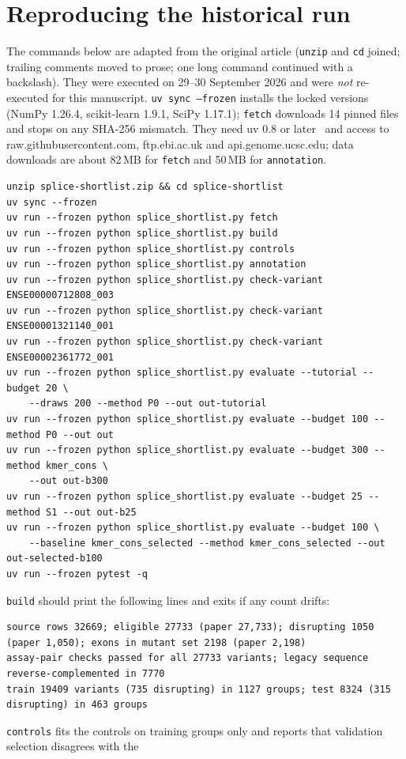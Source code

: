 \documentclass[11pt]{article}
\begin{document}
\section{Reproducing the historical run}\label{app:repro}
The commands below are adapted from the original article (\texttt{unzip} and \texttt{cd} joined; trailing comments moved
to prose; one long command continued with a backslash). They were executed on 29--30 September 2026 and were
\emph{not} re-executed for this manuscript. \texttt{uv sync --frozen} installs the locked versions (NumPy 1.26.4,
scikit-learn 1.9.1, SciPy 1.17.1); \texttt{fetch} downloads 14 pinned files and stops on any SHA-256 mismatch. They need uv 0.8 or later~\citep{uv} and access to
raw.githubusercontent.com, ftp.ebi.ac.uk and api.genome.ucsc.edu; data downloads are about 82\,MB for
\texttt{fetch} and 50\,MB for \texttt{annotation}.
\begin{lstlisting}
unzip splice-shortlist.zip && cd splice-shortlist
uv sync --frozen
uv run --frozen python splice_shortlist.py fetch
uv run --frozen python splice_shortlist.py build
uv run --frozen python splice_shortlist.py controls
uv run --frozen python splice_shortlist.py annotation
uv run --frozen python splice_shortlist.py check-variant ENSE00000712808_003
uv run --frozen python splice_shortlist.py check-variant ENSE00001321140_001
uv run --frozen python splice_shortlist.py check-variant ENSE00002361772_001
uv run --frozen python splice_shortlist.py evaluate --tutorial --budget 20 \
    --draws 200 --method P0 --out out-tutorial
uv run --frozen python splice_shortlist.py evaluate --budget 100 --method P0 --out out
uv run --frozen python splice_shortlist.py evaluate --budget 300 --method kmer_cons \
    --out out-b300
uv run --frozen python splice_shortlist.py evaluate --budget 25 --method S1 --out out-b25
uv run --frozen python splice_shortlist.py evaluate --budget 100 \
    --baseline kmer_cons_selected --method kmer_cons_selected --out out-selected-b100
uv run --frozen pytest -q
\end{lstlisting}
\texttt{build} should print the following lines and exits if any count drifts:
\begin{lstlisting}
source rows 32669; eligible 27733 (paper 27,733); disrupting 1050 (paper 1,050); exons in mutant set 2198 (paper 2,198)
assay-pair checks passed for all 27733 variants; legacy sequence reverse-complemented in 7770
train 19409 variants (735 disrupting) in 1127 groups; test 8324 (315 disrupting) in 463 groups
\end{lstlisting}
\texttt{controls} fits the controls on training groups only and reports that validation selection disagrees with the
\end{document}

